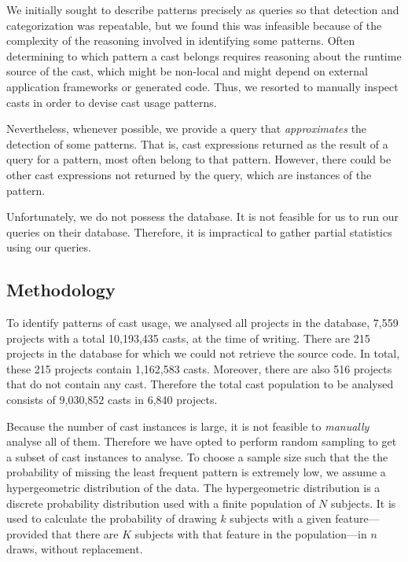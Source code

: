 We initially sought to describe patterns precisely as \ql{} queries so that
detection and categorization was repeatable,
but we found this was infeasible because of the
complexity of the reasoning involved in identifying some patterns.
Often determining to which pattern a cast belongs requires reasoning about the runtime source of the cast,
which might be non-local and might depend on external application frameworks or generated code.
Thus, we resorted to manually inspect casts in order to devise cast usage patterns.

Nevertheless, whenever possible,
we provide a \ql{} query that \emph{approximates} the detection of some patterns.
That is, cast expressions returned as the result of a \ql{} query for a pattern,
most often belong to that pattern.
However, there could be other cast expressions not returned by the query,
which are instances of the pattern.

Unfortunately, we do not possess the \lgtm{} database.
It is not feasible for us to run our queries on their database.
Therefore, it is impractical to gather partial statistics using our queries.


\subsection*{Methodology}

To identify patterns of cast usage, we analysed all \java{} projects in the \lgtm{} database, 7,559 projects
with a total 10,193,435 casts, at the time of writing.
There are 215 projects in the database for which we could not retrieve the source code.
In total, these 215 projects contain 1,162,583 casts.
Moreover, there are also 516 projects that do not contain any cast.
Therefore the total cast population to be analysed consists of 9,030,852 casts in 6,840 projects.

Because the number of cast instances is large, it is not feasible to \emph{manually} analyse all of them.
Therefore we have opted to perform random sampling to get a subset of cast instances to analyse.
To choose a sample size such that the
the probability of missing the least frequent pattern is extremely low, we assume a
hypergeometric distribution of the data.
The hypergeometric distribution is a discrete probability distribution used with a finite population of $N$ subjects.
It is used to calculate the probability of drawing $k$ subjects with a given feature---provided that there are $K$ subjects with that feature in the population---in $n$ draws, without replacement.

